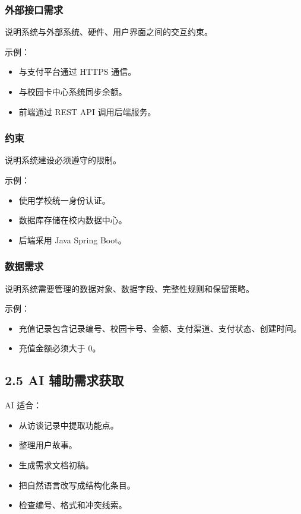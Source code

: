 \documentclass[UTF8,zihao=-4]{ctexart}
\begin{document}
\subsubsection{外部接口需求}

说明系统与外部系统、硬件、用户界面之间的交互约束。

示例：

\begin{itemize}
\item 与支付平台通过 HTTPS 通信。
\item 与校园卡中心系统同步余额。
\item 前端通过 REST API 调用后端服务。
\end{itemize}

\subsubsection{约束}

说明系统建设必须遵守的限制。

示例：

\begin{itemize}
\item 使用学校统一身份认证。
\item 数据库存储在校内数据中心。
\item 后端采用 Java Spring Boot。
\end{itemize}

\subsubsection{数据需求}

说明系统需要管理的数据对象、数据字段、完整性规则和保留策略。

示例：

\begin{itemize}
\item 充值记录包含记录编号、校园卡号、金额、支付渠道、支付状态、创建时间。
\item 充值金额必须大于 0。
\end{itemize}

\subsection{2.5 AI 辅助需求获取}

AI 适合：

\begin{itemize}
\item 从访谈记录中提取功能点。
\item 整理用户故事。
\item 生成需求文档初稿。
\item 把自然语言改写成结构化条目。
\item 检查编号、格式和冲突线索。
\end{itemize}
\end{document}

